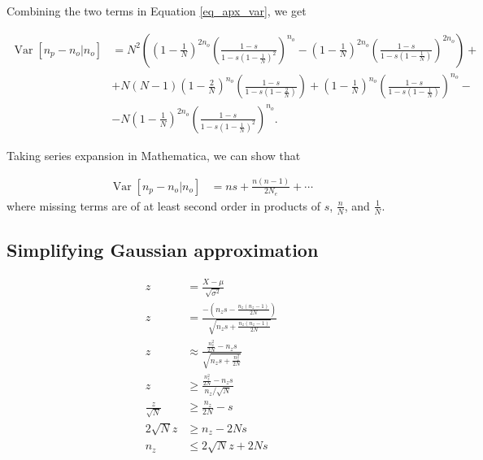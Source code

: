 \documentclass[review]{elsarticle}
\begin{document}
Combining the two terms in Equation \eqref{eq_apx_var}, we get

\newcommand{\vara}[1]{\left(1-\frac{#1}{N}\right)}
\newcommand{\varb}[1]{\left(\frac{1-s}{1-s #1}\right)}

\begin{equation}
  \begin{aligned}
    \operatorname{Var}[n_p-n_o | n_o] &=
    N^2\left( \vara{1}^{2n_o}\varb{\vara{1}^2}^{n_o}-\vara{1}^{2n_o}\varb{\vara{1}}^{2n_o} \right) + \\
    &+ N(N-1)\vara{2}^{n_o}\varb{\vara{2}} + \vara{1}^{n_o}\varb{\vara{1}}^{n_o} - \\
    &- N\vara{1}^{2n_o} \varb{\vara{1}^{2}}^{n_o}.
    \label{eq_exact_var}
  \end{aligned}
\end{equation}

Taking series expansion in Mathematica, we can show that  

\begin{equation}
  \begin{aligned}
    \operatorname{Var}[n_p-n_o | n_o] &= n s + \frac{n (n-1)}{2 N_e}  + \cdots
    \label{eq_exact_var}
  \end{aligned}
\end{equation}
where missing terms are of at least second order in products of  $s$, $\frac{n}{N}$,  and $\frac{1}{N}.$

\subsection{Simplifying Gaussian approximation}
\label{subsec_apx_gauss}

\begin{equation}
\begin{aligned}
  z &= \frac{X-\mu}{\sqrt{\sigma^2}} \\
  z &= \frac{-\left(  n_zs - \frac{n_z(n_z-1)}{2N} \right)}	{\sqrt{n_zs + \frac{n_z(n_z-1)}{2N}}} \\
  z &\approx \frac{\frac{n_z^2}{2N} - n_z s}	{\sqrt{n_zs + \frac{n_z^2}{2N}}} \\
  z &\geq \frac{\frac{n_z^2}{2N} - n_z s}{n_z / \sqrt{N}} \\
  \frac{z}{\sqrt{N}} &\geq \frac{n_z}{2N} - s \\
  2\sqrt{N}z &\geq n_z - 2Ns \\
  n_z &\leq 2\sqrt{N}z + 2Ns
\end{aligned}
\end{equation}
\end{document}
